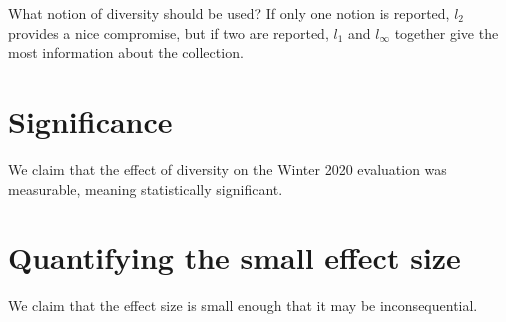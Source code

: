 \documentclass{article}
\begin{document}
  What notion of diversity should be used?  If only one notion is
  reported, $l_2$ provides a nice compromise, but if two are reported,
  $l_1$ and $l_\infty$ together give the most information about the
  collection.

  \section{Significance}
  We claim that the effect of diversity on the Winter 2020 evaluation
  was measurable, meaning statistically significant.

  \section{Quantifying the small effect size}
  We claim that the effect size is small enough that it may be
  inconsequential.
  
  
\end{document}
